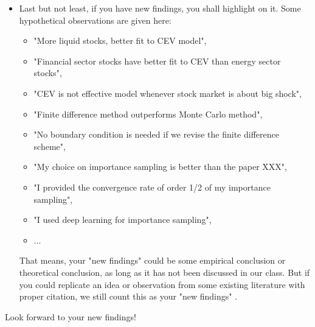 \documentclass{article}
\begin{document}
\begin{itemize}
\item Last but not least, if you have new findings, you shall highlight on it. 
Some hypothetical observations are given here: 
\begin{itemize}
 \item "More liquid stocks, better fit to CEV model", 
 \item 
"Financial sector stocks have better fit to CEV than energy sector stocks", 
\item 
"CEV is not effective model whenever stock market is about big shock", 
\item 
"Finite difference method outperforms Monte Carlo method",
\item 
"No boundary condition is needed if we revise the finite difference scheme", 
\item
"My choice on importance sampling is better than 
the paper XXX", 
\item 
"I provided the convergence rate of order 1/2 of my importance sampling",
\item 
"I used deep learning for importance sampling", 
\item ...
\end{itemize}

That means, your "new findings" could be some empirical conclusion 
or theoretical conclusion, as long as it has not been discussed in our class. 
But if you could replicate an idea or observation from some existing literature with proper citation, we still count this as your "new findings" .
\end{itemize}

Look forward to your new findings!
\end{document}
